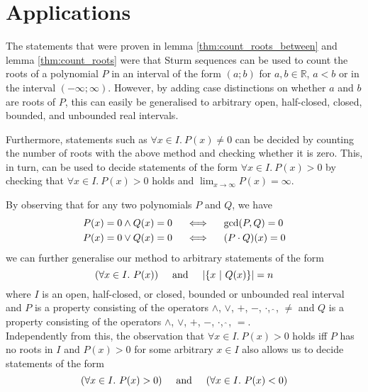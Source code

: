 \documentclass[11pt,a4paper,oneside]{article}
\newcommand{\RR}{\mathbb{R}}
\begin{document}
\newpage
\section{Applications}
\label{sec:applications}

The statements that were proven in lemma \ref{thm:count_roots_between} and lemma \ref{thm:count_roots} were that Sturm sequences can be used to count the roots of a polynomial $P$ in an interval of the form $(a;b)$ for $a,b\in\RR$, $a < b$ or in the interval $(-\infty;\infty)$. However, by adding case distinctions on whether $a$ and $b$ are roots of $P$, this can easily be generalised to arbitrary open, half-closed, closed, bounded, and unbounded real intervals.

Furthermore, statements such as $\forall x \in I.\ P(x) \neq 0$ can be decided by counting the number of roots with the above method and checking whether it is zero. This, in turn, can be used to decide statements of the form $\forall x\in I.\ P(x) > 0$ by checking that $\forall x\in I.\ P(x) > 0$ holds and $\lim_{x\to\infty} P(x) = \infty$.

By observing that for any two polynomials $P$ and $Q$, we have 
\begin{align*}
P(x) = 0 \wedge Q(x) = 0\hskip5mm&\Longleftrightarrow\hskip5mm \gcd(P,Q) = 0\\
P(x) = 0 \vee Q(x) = 0\hskip5mm&\Longleftrightarrow\hskip5mm (P\cdot Q)(x) = 0
\end{align*}
we can further generalise our method to arbitrary statements of the form
$$(\forall x \in I.\ P(x))\hskip5mm\mathrm{and}\hskip5mm |\{x\ |\ Q(x)\}| = n$$
where $I$ is an open, half-closed, or closed, bounded or unbounded real interval and $P$ is a property consisting of the operators $\wedge$, $\vee$, $+$, $-$, $\cdot$, $\hat{\ }$, $\neq$ and $Q$ is a property consisting of the operators $\wedge$, $\vee$, $+$, $-$, $\cdot$, $\hat{\ }$, $=$.\\

Independently from this, the observation that $\forall x\in I.\ P(x)>0$ holds iff $P$ has no roots in $I$ and $P(x)>0$ for some arbitrary $x\in I$ also allows us to decide statements of the form
$$(\forall x\in I.\ P(x) > 0)\hskip5mm\mathrm{and}\hskip5mm(\forall x\in I.\ P(x) < 0)$$\vskip5mm
\end{document}

